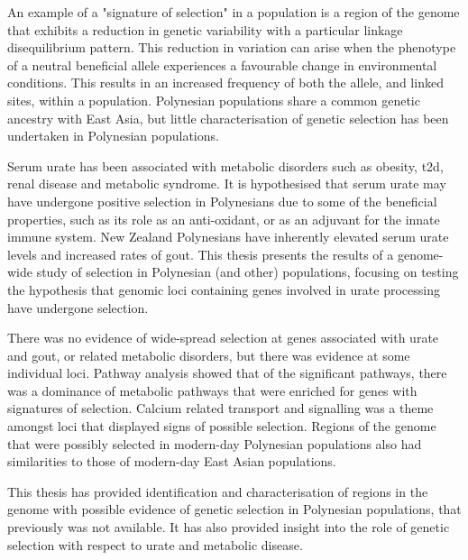 An example of a "signature of selection" in a population is a region of the genome that exhibits a reduction in genetic variability with a particular linkage disequilibrium pattern. This reduction in variation can arise when the phenotype of a neutral beneficial allele experiences a favourable change in environmental conditions. This results in an increased frequency of both the allele, and linked sites, within a population. Polynesian populations share a common genetic ancestry with East Asia, but little characterisation of genetic selection has been undertaken in Polynesian populations.

Serum urate has been associated with metabolic disorders such as obesity, \gls{t2d}, renal disease and metabolic syndrome. It is hypothesised that serum urate may have undergone positive selection in Polynesians due to some of the beneficial properties, such as its role as an anti-oxidant, or as an adjuvant for the innate immune system. New Zealand Polynesians have inherently elevated serum urate levels and increased rates of gout. This thesis presents the results of a genome-wide study of selection in Polynesian (and other) populations, focusing on testing the hypothesis that genomic loci containing genes involved in urate processing have undergone selection.

There was no evidence of wide-spread selection at genes associated with urate and gout, or related metabolic disorders, but there was evidence at some individual loci. Pathway analysis showed that of the significant pathways, there was a dominance of metabolic pathways that were enriched for genes with signatures of selection. Calcium related transport and signalling was a theme amongst loci that displayed signs of possible selection. Regions of the genome that were possibly selected in modern-day Polynesian populations also had similarities to those of modern-day East Asian populations.

This thesis has provided identification and characterisation of regions in the genome with possible evidence of genetic selection in Polynesian populations, that previously was not available. It has also provided insight into the role of genetic selection with respect to urate and metabolic disease.
